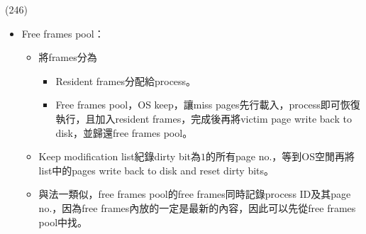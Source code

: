 \begin{theorem}{(246)}
\begin{itemize}
\begin{itemize}
            \item Free frames pool：\begin{itemize}
                \item 將frames分為\begin{itemize}
                    \item Resident frames分配給process。
                    \item Free frames pool，OS keep，讓miss pages先行載入，process即可恢復執行，且加入resident frames，完成後再將victim page write back to disk，並歸還free frames pool。
                \end{itemize} 
                \item Keep modification list紀錄dirty bit為$1$的所有page no.，等到OS空閒再將list中的pages write back to disk and reset dirty bits。
                \item 與法一類似，free frames pool的free frames同時記錄process ID及其page no.，因為free frames內放的一定是最新的內容，因此可以先從free frames pool中找。
            \end{itemize}
        \end{itemize}
    \end{itemize}
\end{theorem}

